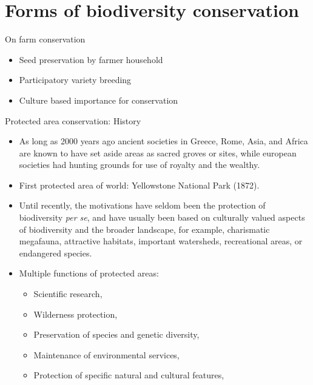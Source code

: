 \documentclass[ignorenonframetext,aspectratio=169]{beamer}
\providecommand{\tightlist}{%
  \setlength{\itemsep}{0pt}\setlength{\parskip}{0pt}}
\begin{document}
\hypertarget{forms-of-biodiversity-conservation}{%
\section{Forms of biodiversity
conservation}\label{forms-of-biodiversity-conservation}}

\begin{frame}{On farm conservation}
\protect\hypertarget{on-farm-conservation}{}

\begin{itemize}
\tightlist
\item
  Seed preservation by farmer household
\item
  Participatory variety breeding
\item
  Culture based importance for conservation
\end{itemize}

\end{frame}

\begin{frame}{Protected area conservation: History}
\protect\hypertarget{protected-area-conservation-history}{}

\begin{itemize}
\tightlist
\item
  As long as 2000 years ago ancient societies in Greece, Rome, Asia, and
  Africa are known to have set aside areas as sacred groves or sites,
  while european societies had hunting grounds for use of royalty and
  the wealthy.
\item
  First protected area of world: Yellowstone National Park (1872).
\item
  Until recently, the motivations have seldom been the protection of
  biodiversity \emph{per se}, and have usually been based on culturally
  valued aspects of biodiversity and the broader landscape, for example,
  charismatic megafauna, attractive habitats, important watersheds,
  recreational areas, or endangered species.
\item
  Multiple functions of protected areas:

  \begin{itemize}
  \tightlist
  \item
    Scientific research,
  \item
    Wilderness protection,
  \item
    Preservation of species and genetic diversity,
  \item
    Maintenance of environmental services,
  \item
    Protection of specific natural and cultural features,
  \end{itemize}
\end{itemize}

\end{frame}
\end{document}
